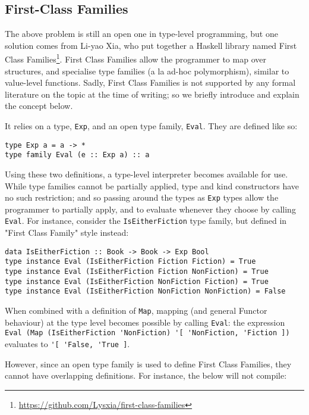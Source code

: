 \documentclass[12pt, a4paper, bibliography=totocnumbered]{scrreprt}
\newcommand{\inline}[1]{\lstinline[basicstyle=\ttfamily\footnotesize]{#1}}
\begin{document}
\subsection{First-Class Families}

The above problem is still an open one in type-level programming, but one solution comes from Li-yao Xia, who put together a Haskell library named First Class Families\footnote{\url{https://github.com/Lysxia/first-class-families}}. First Class Families allow the programmer to map over structures, and specialise type families (a la ad-hoc polymorphism), similar to value-level functions. Sadly, First Class Families is not supported by any formal literature on the topic at the time of writing; so we briefly introduce and explain the concept below.

It relies on a type, \inline{Exp}, and an open type family, \inline{Eval}. They are defined like so:

\begin{lstlisting}
type Exp a = a -> *
type family Eval (e :: Exp a) :: a
\end{lstlisting}

Using these two definitions, a type-level interpreter becomes available for use. While type families cannot be partially applied, type and kind constructors have no such restriction; and so passing around the types as \inline{Exp} types allow the programmer to partially apply, and to evaluate whenever they choose by calling \inline{Eval}. For instance, consider the \inline{IsEitherFiction} type family, but defined in "First Class Family" style instead:

\begin{lstlisting}
data IsEitherFiction :: Book -> Book -> Exp Bool
type instance Eval (IsEitherFiction Fiction Fiction) = True
type instance Eval (IsEitherFiction Fiction NonFiction) = True
type instance Eval (IsEitherFiction NonFiction Fiction) = True
type instance Eval (IsEitherFiction NonFiction NonFiction) = False
\end{lstlisting}

When combined with a definition of \inline{Map}, mapping (and general Functor behaviour) at the type level becomes possible by calling \inline{Eval}: the expression \inline{Eval (Map (IsEitherFiction 'NonFiction) '[ 'NonFiction, 'Fiction ])} evaluates to \inline{'[ 'False, 'True ]}.

However, since an open type family is used to define First Class Families, they cannot have overlapping definitions. For instance, the below will not compile:
\end{document}
